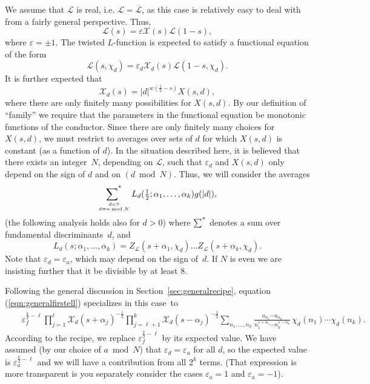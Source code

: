 \documentclass[12pt,letterpaper]{amsart}
\theoremstyle{plain}
\theoremstyle{definition}
\theoremstyle{remark}
\numberwithin{equation}{subsection}
\numberwithin{theorem}{subsection}
\numberwithin{table}{subsection}
\newcommand{\ontop}[2]{\genfrac{}{}{0pt}{}{#1}{#2}}
\renewcommand{\mod}{\bmod}
\def\sumstar{\operatornamewithlimits{\sum\nolimits^*}}
\begin{document}
We assume that $\mathcal{L}$ is real,
i.e. $\mathcal{L}=\overline{\mathcal{L}}$,
as this case is relatively easy to deal with from a
fairly general perspective.
Thus,
\begin{equation}
\mathcal{L}(s)= \varepsilon \mathcal{X}(s)\mathcal{L}(1-s),
\end{equation}
where $\varepsilon=\pm1$.
The twisted $L$-function is expected to satisfy a functional equation of
the form
\begin{equation} \label{eqn:Lschidfe}
\mathcal{L}(s,\chi_d)= \varepsilon_d \mathcal{X}_d(s)
				{\mathcal{L}}(1-s,\chi_d).
\end{equation}
It is further expected that 
\begin{equation} \label{eqn:Xdform}
\mathcal{X}_d(s) =|d|^{w(\frac12 -s)} X(s, d), 
\end{equation}
where there are only finitely 
many possibilities for $X(s, d)$. 
By our definition of ``family'' we require that the parameters in the
functional equation be monotonic functions of the conductor.
Since there are only finitely many choices for $X(s, d)$, we must
restrict to averages over sets of $d$ for which $X(s, d)$
is constant (as a function of $d$).
In the situation described here, 
it is believed that there exists an integer~$N$, depending on 
$\mathcal{L}$, such that $\varepsilon_d$ and  $X(s,d)$
only depend on the sign of $d$ and on $(d\mod N)$.  Thus, we will
consider the averages
\begin{equation}
\sumstar_{  \ontop{d<0}{d\equiv a \mod N} } 
L_d(\tfrac12;\alpha_1,\dots,\alpha_k) g(|d|),
\end{equation}
(the following analysis holds also for $d>0$)
where $\sumstar$ denotes a sum over fundamental discriminants~$d$,
and
\begin{equation}
L_d(s;\alpha_1,\dots,\alpha_k)=
 Z_\mathcal{L}(s +\alpha_1,\chi_d)\dots
Z_\mathcal{L}(s +\alpha_k,\chi_d)
.
\end{equation}
Note that $\varepsilon_d=\varepsilon_a$, which may depend on the sign of~$d$.
If $N$ is even we are insisting further that it be divisible by at least $8$.

Following the general discussion in Section~\ref{sec:generalrecipe}, 
equation (\ref{eqn:generalfirstell}) specializes in this case~to
\begin{eqnarray}
&   & 
\varepsilon_f^{\frac{k}{2}-\ell}
\prod_{j=1}^\ell \mathcal{X}_d(s +\alpha_j)^{-\frac12}
\prod_{j=\ell+1}^k \mathcal{X}_d(s -\alpha_j)^{-\frac12}
\sum_{n_1,\dots, n_k}
    \frac{a_{n_1}\cdots a_{n_k}
}{n_1^{s +\alpha_1}\cdots n_k^{s-\alpha_k}}
\, 
\chi_d(n_1)\cdots \chi_d(n_k)
.
 \end{eqnarray}
According to the recipe, we replace $\varepsilon_f^{\frac{k}{2}-\ell}$
by its expected value.  
We have assumed (by our choice of $a\mod N$) that $\varepsilon_d=\varepsilon_a$
for all $d$, so the expected value is $\varepsilon_a^{\frac{k}{2}-\ell}$ and
we will have a contribution from all $2^k$ terms.
(That expression is more transparent is you separately consider the cases
$\varepsilon_a=1$ and $\varepsilon_a=-1$).
\end{document}
